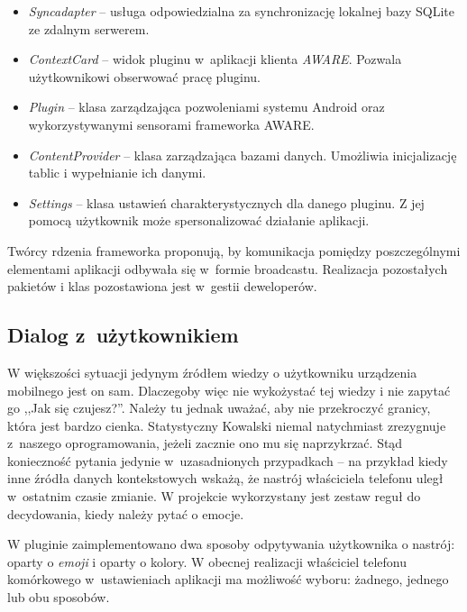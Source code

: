 \begin{itemize}
	\item \textit{Syncadapter} -- usługa odpowiedzialna za synchronizację lokalnej bazy SQLite ze zdalnym serwerem.
	
	\item \textit{ContextCard} -- widok pluginu w~aplikacji klienta \textit{AWARE}. Pozwala użytkownikowi obserwować pracę pluginu.
	
	\item \textit{Plugin} -- klasa zarządzająca pozwoleniami systemu Android oraz wykorzystywanymi sensorami frameworka AWARE.
	
	\item \textit{ContentProvider} -- klasa zarządzająca bazami danych. Umożliwia inicjalizację tablic i wypełnianie ich danymi.
	
	\item \textit{Settings} -- klasa ustawień charakterystycznych dla danego pluginu. Z jej pomocą użytkownik może spersonalizować działanie aplikacji.
\end{itemize}

Twórcy rdzenia frameworka proponują, by komunikacja pomiędzy poszczególnymi elementami aplikacji odbywała się w~formie broadcastu. Realizacja pozostałych pakietów i klas pozostawiona jest w~gestii deweloperów\cite{AwareFramework}. 


\subsection{Dialog z~użytkownikiem}

W większości sytuacji jedynym źródłem wiedzy o użytkowniku urządzenia mobilnego jest on sam. Dlaczegoby więc nie wykożystać tej wiedzy i nie zapytać go ,,Jak się czujesz?''. Należy tu jednak uważać, aby nie przekroczyć granicy, która jest bardzo cienka. Statystyczny Kowalski niemal natychmiast zrezygnuje z~naszego oprogramowania, jeżeli zacznie ono mu się naprzykrzać. Stąd konieczność pytania jedynie w~uzasadnionych przypadkach -- na przykład kiedy inne źródła danych kontekstowych wskażą, że nastrój właściciela telefonu uległ w~ostatnim czasie zmianie. W projekcie wykorzystany jest zestaw reguł do decydowania, kiedy należy pytać o emocje.

W pluginie zaimplementowano dwa sposoby odpytywania użytkownika o nastrój: oparty o \textit{emoji} i oparty o kolory. W obecnej realizacji właściciel telefonu komórkowego w~ustawieniach aplikacji ma możliwość wyboru: żadnego, jednego lub obu sposobów.

